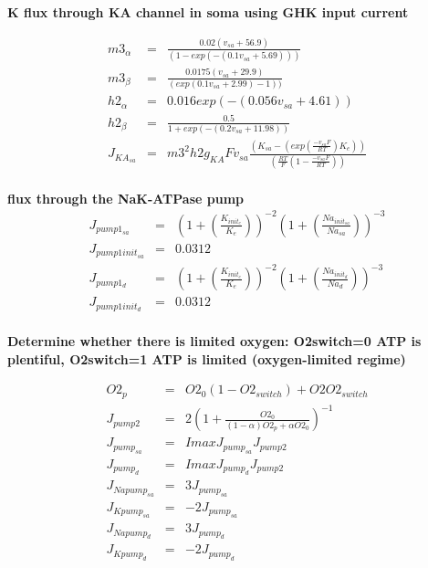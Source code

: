 \documentclass[fleqn]{report}
\numberwithin{equation}{section}
\numberwithin{equation}{section}
\begin{document}
 \textbf{K flux through KA channel in soma using GHK input current}

 \begin{eqnarray}
	            m3_{\alpha}     &=& \frac{0.02 (v_{sa} + 56.9)}{(1 - exp(-(0.1 v_{sa} + 5.69)))}\\
	            m3_{\beta}      &=& \frac{0.0175  (v_{sa} + 29.9)}{(exp(0.1  v_{sa} + 2.99) - 1))}\\
	            h2_{\alpha}     &=& 0.016 exp(-(0.056 v_{sa} + 4.61))\\
	            h2_{\beta}      &=& \frac{0.5}{1 + exp(-(0.2  v_{sa} + 11.98))}\\
	            J_{KA_{sa}}     &=& m3^2 h2 g_{KA} F v_{sa} \frac{(K_{sa} - (exp(\frac{-v_{sa} F}{RT})  K_e))}{(\frac{RT}{F} (1 - \frac{-v_{sa} F}{RT}))}\\
 \end{eqnarray}
	
	
	        \textbf{flux through the NaK-ATPase pump}
	        \begin{eqnarray}
	            J_{pump1_{sa}}      &=& (1 + (\frac{K_{init_{e}}}{K_e} ))^{-2} (1 + (\frac{Na_{init_{sa}}}{Na_{sa}} )) ^ {-3}\\
	            J_{pump1init_{sa}}  &=& 0.0312\\ %
	            J_{pump1_{d}}       &=& (1 + (\frac{K_{init_{e}}}{K_e} ))^{-2} (1 + (\frac{Na_{init_{d}}}{Na_{d}} )) ^ {-3}\\
	            J_{pump1init_{d}}   &=&  0.0312\\  %
	        \end{eqnarray}

	            
\textbf{Determine whether there is limited oxygen: O2switch=0 ATP is plentiful, O2switch=1 ATP is limited (oxygen-limited regime)}

\begin{eqnarray}
	            O2_{p}            &=& O2_{0}  (1 - O2_{switch}) + O2 O2_{switch}\\
	            J_{pump2}         &=& 2 (1 + \frac{O2_0}{(1 - \alpha) O2_{p}  + \alpha O2_{0}})^{-1}\\
	            J_{pump_{sa}}   &=& Imax  J_{pump_{sa}}  J_{pump2}\\
	            J_{pump_{d}}    &=& Imax  J_{pump_{d}}  J_{pump2}\\
	            J_{Napump_{sa}} &=& 3  J_{pump_{sa}}\\
	            J_{Kpump_{sa}}  &=& -2  J_{pump_{sa}}\\
	            J_{Napump_{d}}  &=& 3  J_{pump_{d}}\\
	            J_{Kpump_{d}}   &=& -2  J_{pump_{d}}\\
\end{eqnarray}
\end{document}
